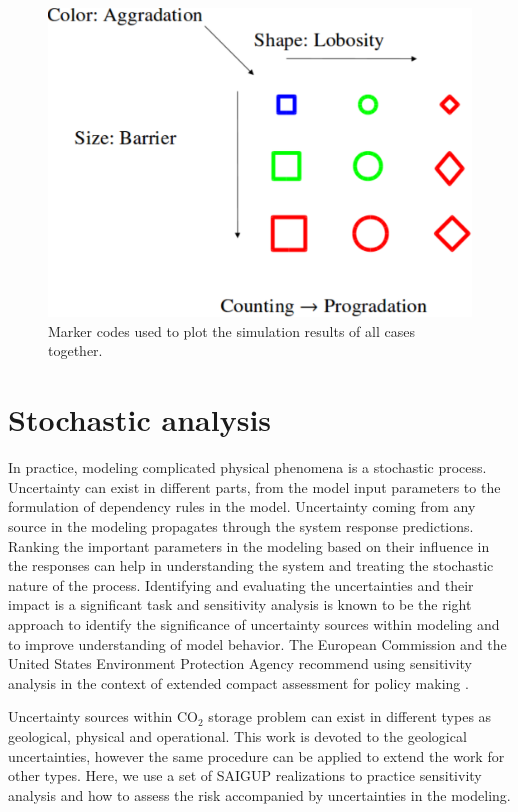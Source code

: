 \begin{figure}
  \centering
  \includegraphics[width=0.65 \linewidth]{./figurer/codes} 
  \caption{Marker codes used to plot the simulation results of all cases
together.}
  \label{fig:codes}
%
\end{figure}

\section{Stochastic analysis}
\label{sec:StochasticAnalysis}
In practice, modeling complicated physical phenomena is a stochastic process.
Uncertainty can exist in different parts, from the model input parameters to the
formulation of dependency rules in the model. Uncertainty coming from any source
in the modeling propagates through the system response predictions. Ranking the
important parameters in the modeling based on their influence in the responses
can help in understanding the system and treating the stochastic nature of the
process. Identifying and evaluating the uncertainties and their impact is a
significant task and sensitivity analysis is known to be the right approach to
identify the significance of uncertainty sources within modeling and to improve
understanding of model behavior. The European Commission and the United States
Environment Protection Agency recommend using sensitivity analysis in the
context of extended compact assessment for policy making \cite{saltelli4global}.

Uncertainty sources within $\mbox{CO}_{2}$ storage problem can exist in
different types as geological, physical and operational. This work is devoted to
the geological uncertainties, however the same procedure can be applied to
extend the work for other types. Here, we use a set of SAIGUP realizations to
practice sensitivity analysis and how to assess the risk accompanied by
uncertainties in the modeling. 

